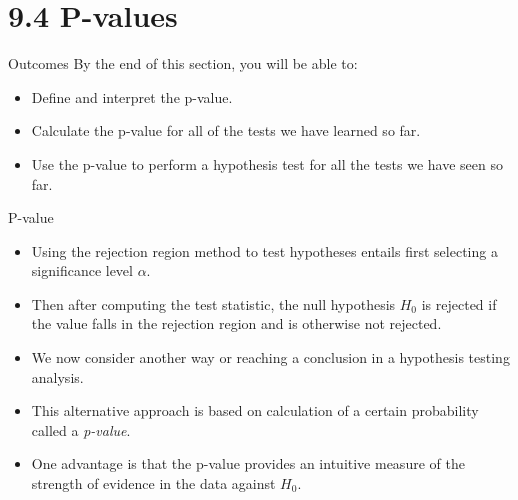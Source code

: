 \documentclass[
  ignorenonframetext,
]{beamer}
\providecommand{\tightlist}{%
  \setlength{\itemsep}{0pt}\setlength{\parskip}{0pt}}\usepackage{longtable,booktabs,array}
\begin{document}
\hypertarget{p-values}{%
\section{9.4 P-values}\label{p-values}}

\begin{frame}{Outcomes}
\protect\hypertarget{outcomes-3}{}
By the end of this section, you will be able to:

\begin{itemize}[<+->]
\tightlist
\item
  Define and interpret the p-value.
\item
  Calculate the p-value for all of the tests we have learned so far.
\item
  Use the p-value to perform a hypothesis test for all the tests we have
  seen so far.
\end{itemize}
\end{frame}

\begin{frame}{P-value}
\protect\hypertarget{p-value}{}
\begin{itemize}[<+->]
\tightlist
\item
  Using the rejection region method to test hypotheses entails first
  selecting a significance level \(\alpha\).
\item
  Then after computing the test statistic, the null hypothesis \(H_{0}\)
  is rejected if the value falls in the rejection region and is
  otherwise not rejected.
\item
  We now consider another way or reaching a conclusion in a hypothesis
  testing analysis.
\item
  This alternative approach is based on calculation of a certain
  probability called a \emph{p-value}.
\item
  One advantage is that the p-value provides an intuitive measure of the
  strength of evidence in the data against \(H_{0}\).
\end{itemize}
\end{frame}
\end{document}

